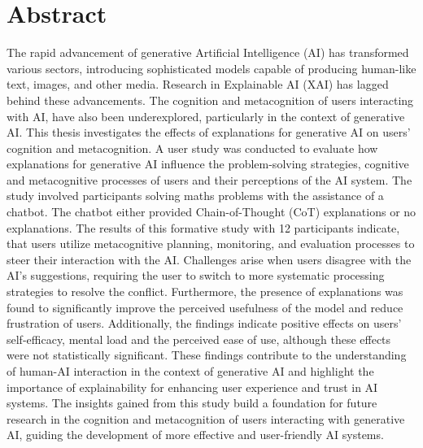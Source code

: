 \section*{Abstract}

The rapid advancement of generative Artificial Intelligence (AI) has transformed various sectors, introducing sophisticated models capable of producing human-like text, images, and other media. Research in Explainable AI (XAI) has lagged behind these advancements. The cognition and metacognition of users interacting with AI, have also been underexplored, particularly in the context of generative AI. This thesis investigates the effects of explanations for generative AI on users' cognition and metacognition. A user study was conducted to evaluate how explanations for generative AI influence the problem-solving strategies, cognitive and metacognitive processes of users and their perceptions of the AI system. The study involved participants solving maths problems with the assistance of a chatbot. The chatbot either provided Chain-of-Thought (CoT) explanations or no explanations. The results of this formative study with 12 participants indicate, that users utilize metacognitive planning, monitoring, and evaluation processes to steer their interaction with the AI. Challenges arise when users disagree with the AI's suggestions, requiring the user to switch to more systematic processing strategies to resolve the conflict. Furthermore, the presence of explanations was found to significantly improve the perceived usefulness of the model and reduce frustration of users. Additionally, the findings indicate positive effects on users' self-efficacy, mental load and the perceived ease of use, although these effects were not statistically significant. These findings contribute to the understanding of human-AI interaction in the context of generative AI and highlight the importance of explainability for enhancing user experience and trust in AI systems. The insights gained from this study build a foundation for future research in the cognition and metacognition of users interacting with generative AI, guiding the development of more effective and user-friendly AI systems.
